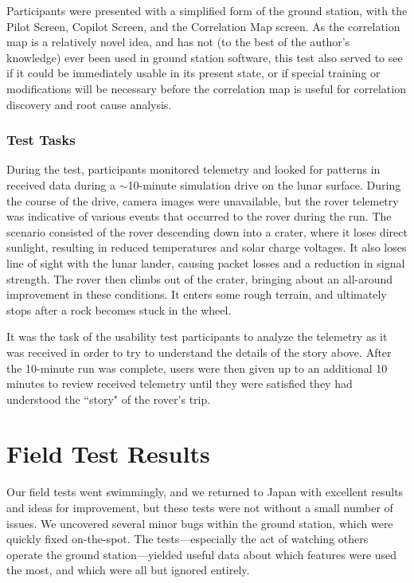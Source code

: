 Participants were presented with a simplified form of the ground station, with the Pilot Screen, Copilot Screen, and the Correlation Map screen. As the correlation map is a relatively novel idea, and has not (to the best of the author's knowledge) ever been used in ground station software, this test also served to see if it could be immediately usable in its present state, or if special training or modifications will be necessary before the correlation map is useful for correlation discovery and root cause analysis.

\subsubsection{Test Tasks}

During the test, participants monitored telemetry and looked for patterns in received data during a $\sim$10-minute simulation drive on the lunar surface. During the course of the drive, camera images were unavailable, but the rover telemetry was indicative of various events that occurred to the rover during the run. The scenario consisted of the rover descending down into a crater, where it loses direct sunlight, resulting in reduced temperatures and solar charge voltages. It also loses line of sight with the lunar lander, causing packet losses and a reduction in signal strength. The rover then climbs out of the crater, bringing about an all-around improvement in these conditions. It enters some rough terrain, and ultimately stops after a rock becomes stuck in the wheel.

It was the task of the usability test participants to analyze the telemetry as it was received in order to try to understand the details of the story above. After the 10-minute run was complete, users were then given up to an additional 10 minutes to review received telemetry until they were satisfied they had understood the ``story" of the rover's trip.

\section{Field Test Results}

Our field tests went swimmingly, and we returned to Japan with excellent results and ideas for improvement, but these tests were not without a small number of issues. We uncovered several minor bugs within the ground station, which were quickly fixed on-the-spot. The tests---especially the act of watching others operate the ground station---yielded useful data about which features were used the most, and which were all but ignored entirely.

